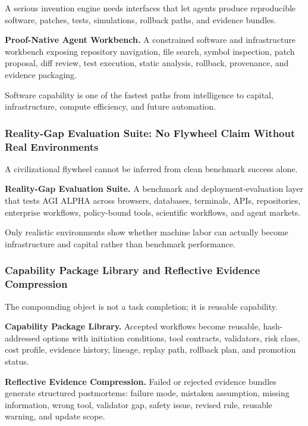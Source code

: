 \documentclass[11pt]{article}
\begin{document}
A serious invention engine needs interfaces that let agents produce reproducible software, patches, tests, simulations, rollback paths, and evidence bundles.

\textbf{Proof-Native Agent Workbench.} A constrained software and infrastructure workbench exposing repository navigation, file search, symbol inspection, patch proposal, diff review, test execution, static analysis, rollback, provenance, and evidence packaging.

Software capability is one of the fastest paths from intelligence to capital, infrastructure, compute efficiency, and future automation.

\subsubsection{Reality-Gap Evaluation Suite: No Flywheel Claim Without Real Environments}\label{reality-gap-evaluation-suite-no-flywheel-claim-without-real-environments}

A civilizational flywheel cannot be inferred from clean benchmark success alone.

\textbf{Reality-Gap Evaluation Suite.} A benchmark and deployment-evaluation layer that tests AGI ALPHA across browsers, databases, terminals, APIs, repositories, enterprise workflows, policy-bound tools, scientific workflows, and agent markets.

Only realistic environments show whether machine labor can actually become infrastructure and capital rather than benchmark performance.

\subsubsection{Capability Package Library and Reflective Evidence Compression}\label{capability-package-library-and-reflective-evidence-compression}

The compounding object is not a task completion; it is reusable capability.

\textbf{Capability Package Library.} Accepted workflows become reusable, hash-addressed options with initiation conditions, tool contracts, validators, risk class, cost profile, evidence history, lineage, replay path, rollback plan, and promotion status.

\textbf{Reflective Evidence Compression.} Failed or rejected evidence bundles generate structured postmortems: failure mode, mistaken assumption, missing information, wrong tool, validator gap, safety issue, revised rule, reusable warning, and update scope.
\end{document}
